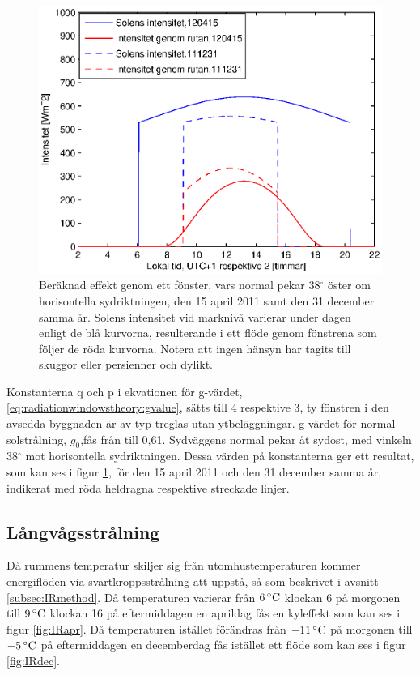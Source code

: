 \begin{figure}[hpbt]
\centering
\includegraphics[scale=0.7]{images/effekt0415and1231.eps}
\caption{\label{fig:effekt0415and1231} Beräknad effekt genom ett fönster, vars normal pekar 38$^{\circ}$ öster om horisontella sydriktningen, den 15 april 2011 samt den 31 december samma år. Solens intensitet vid marknivå varierar under dagen enligt de blå kurvorna, resulterande i ett flöde genom fönstrena som följer de röda kurvorna. Notera att ingen hänsyn har tagits till skuggor eller persienner och dylikt.}
\end{figure}

Konstanterna q och p i ekvationen för g-värdet, \ref{eq:radiationwindowstheory:gvalue}, sätts till 4 respektive 3, ty fönstren i den avsedda byggnaden är av typ treglas utan ytbeläggningar. g-värdet för normal solstrålning, $g_0$,fås från \cite{ASHRAE09} till 0,61. Sydväggens normal pekar åt sydost, med vinkeln 38$^{\circ}$ mot horisontella sydriktningen. Dessa värden på konstanterna ger ett resultat, som kan ses i figur \ref{fig:effekt0415and1231}, för den 15 april 2011 och den 31 december samma år, indikerat med röda heldragna respektive streckade linjer.

\subsection{Långvågsstrålning}

Då rummens temperatur skiljer sig från utomhustemperaturen kommer energiflöden via svartkroppsstrålning att uppstå, så som beskrivet i avsnitt \ref{subsec:IRmethod}. Då temperaturen varierar från $\unit[6]{^{\circ}C}$ klockan 6 på morgonen till $\unit[9]{^{\circ}C}$ klockan 16 på eftermiddagen en aprildag fås en kyleffekt som kan ses i figur \ref{fig:IRapr}. Då temperaturen istället förändras från $\unit[-11]{^{\circ}C}$ på morgonen till $\unit[-5]{^{\circ}C}$ på eftermiddagen en decemberdag fås istället ett flöde som kan ses i figur \ref{fig:IRdec}.

